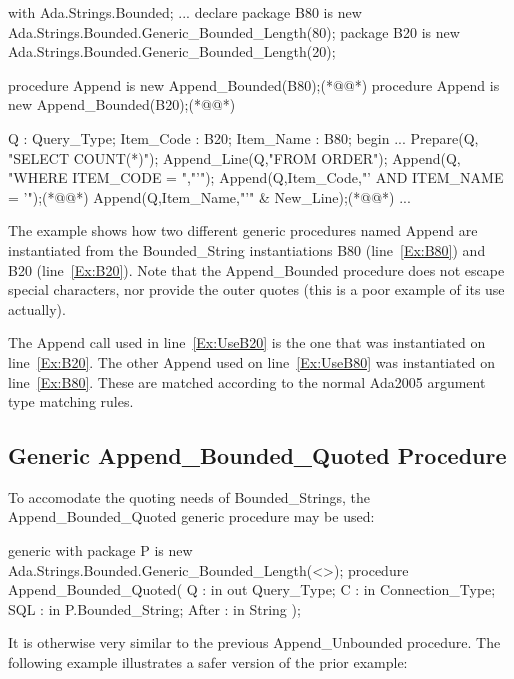 \documentclass[english,letterpaper]{book}
\begin{document}
\begin{NumberedExample}
with Ada.Strings.Bounded;
...
declare
   package B80 
      is new Ada.Strings.Bounded.Generic_Bounded_Length(80);
   package B20 
      is new Ada.Strings.Bounded.Generic_Bounded_Length(20);

   procedure Append is new Append_Bounded(B80);(*@\label{Ex:B80}@*)
   procedure Append is new Append_Bounded(B20);(*@\label{Ex:B20}@*)

   Q :         Query_Type;
   Item_Code : B20;
   Item_Name : B80;
begin
   ...
   Prepare(Q,    "SELECT COUNT(*)");
   Append_Line(Q,"FROM ORDER");
   Append(Q,     "WHERE ITEM_CODE = ","'");
   Append(Q,Item_Code,"' AND ITEM_NAME = '");(*@\label{Ex:UseB20}@*)
   Append(Q,Item_Name,"'" & New_Line);(*@\label{Ex:UseB80}@*)
   ...
\end{NumberedExample}

The example shows how two different generic procedures named Append
are instantiated from the Bounded\_String instantiations B80 (line~\ref{Ex:B80})
and B20 (line~\ref{Ex:B20}). Note that the Append\_Bounded procedure does not escape
special characters, nor provide the outer quotes (this is a poor example of its
use actually).

The Append call used in line~\ref{Ex:UseB20} is the one that was
instantiated on line~\ref{Ex:B20}. The other Append used on
line~\ref{Ex:UseB80} was instantiated on line~\ref{Ex:B80}. These
are matched according to the normal Ada2005 argument type matching
rules.

\subsection{Generic Append\_Bounded\_Quoted Procedure}

To accomodate the quoting needs of Bounded\_Strings, the Append\_Bounded\_Quoted
generic procedure may be used:

\begin{Code}
generic
   with package P
      is new Ada.Strings.Bounded.Generic_Bounded_Length(<>);
procedure Append_Bounded_Quoted(
   Q :     in out Query_Type;
   C :     in     Connection_Type;
   SQL :   in     P.Bounded_String;
   After : in     String
);
\end{Code}

It is otherwise very similar to the previous Append\_Unbounded procedure.
The following example illustrates a safer version of the prior example:
\end{document}
